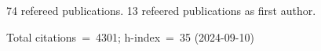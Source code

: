 74 refereed publications. 13 refeered publications as first author.

Total citations~=~4301; h-index~=~35 (2024-09-10)